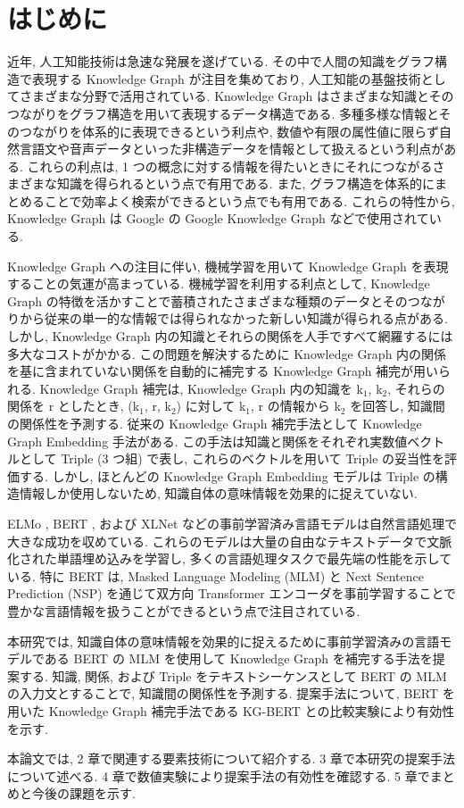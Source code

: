 \newpage
\changeindent{0cm}
\section{はじめに}
\changeindent{2cm}


近年, 人工知能技術は急速な発展を遂げている. その中で人間の知識をグラフ構造で表現する Knowledge Graph \cite{kg} が注目を集めており, 人工知能の基盤技術としてさまざまな分野で活用されている. Knowledge Graph はさまざまな知識とそのつながりをグラフ構造を用いて表現するデータ構造である. 多種多様な情報とそのつながりを体系的に表現できるという利点や, 数値や有限の属性値に限らず自然言語文や音声データといった非構造データを情報として扱えるという利点がある. これらの利点は, 1 つの概念に対する情報を得たいときにそれにつながるさまざまな知識を得られるという点で有用である. また, グラフ構造を体系的にまとめることで効率よく検索ができるという点でも有用である. これらの特性から, Knowledge Graph は Google の Google Knowledge Graph \cite{google_knowledge_graph} などで使用されている. \par
Knowledge Graph への注目に伴い, 機械学習を用いて Knowledge Graph を表現することの気運が高まっている. 機械学習を利用する利点として, Knowledge Graph の特徴を活かすことで蓄積されたさまざまな種類のデータとそのつながりから従来の単一的な情報では得られなかった新しい知識が得られる点がある. しかし, Knowledge Graph 内の知識とそれらの関係を人手ですべて網羅するには多大なコストがかかる. この問題を解決するために Knowledge Graph 内の関係を基に含まれていない関係を自動的に補完する Knowledge Graph 補完が用いられる. Knowledge Graph 補完は, Knowledge Graph 内の知識を k$_{1}$, k$_{2}$, それらの関係を r としたとき, (k$_{1}$, r, k$_{2}$) に対して k$_{1}$, r の情報から k$_{2}$ を回答し, 知識間の関係性を予測する. 従来の Knowledge Graph 補完手法として Knowledge Graph Embedding 手法がある. この手法は知識と関係をそれぞれ実数値ベクトルとして Triple (3 つ組) で表し, これらのベクトルを用いて Triple の妥当性を評価する. しかし, ほとんどの Knowledge Graph Embedding モデルは Triple の構造情報しか使用しないため, 知識自体の意味情報を効果的に捉えていない. \par
ELMo \cite{ELMo}, BERT \cite{BERT}, および XLNet \cite{XLNet} などの事前学習済み言語モデルは自然言語処理で大きな成功を収めている. これらのモデルは大量の自由なテキストデータで文脈化された単語埋め込みを学習し, 多くの言語処理タスクで最先端の性能を示している. 特に BERT は, Masked Language Modeling (MLM) と Next Sentence Prediction (NSP) を通じて双方向 Transformer エンコーダを事前学習することで豊かな言語情報を扱うことができるという点で注目されている. \par
本研究では, 知識自体の意味情報を効果的に捉えるために事前学習済みの言語モデルである BERT の MLM を使用して Knowledge Graph を補完する手法を提案する. 知識, 関係, および Triple をテキストシーケンスとして BERT の MLM の入力文とすることで, 知識間の関係性を予測する. 提案手法について, BERT を用いた Knowledge Graph 補完手法である KG-BERT \cite{KG-BERT} との比較実験により有効性を示す. \par
本論文では, 2 章で関連する要素技術について紹介する. 3 章で本研究の提案手法について述べる. 4 章で数値実験により提案手法の有効性を確認する. 5 章でまとめと今後の課題を示す. \par

